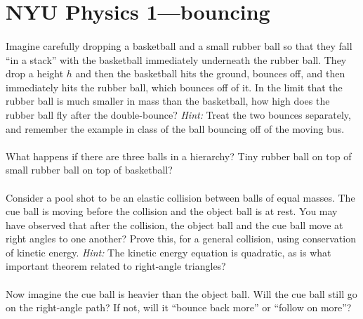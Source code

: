 \documentclass[12pt]{article}
\newcounter{problem}
\begin{document}
\sloppy\sloppypar\raggedbottom\frenchspacing\thispagestyle{empty}

\section*{NYU Physics 1---bouncing}

\paragraph{\theproblem}%
Imagine carefully dropping a basketball and a small rubber ball so
that they fall ``in a stack'' with the basketball immediately
underneath the rubber ball.  They drop a height $h$ and then the
basketball hits the ground, bounces off, and then immediately hits the
rubber ball, which bounces off of it.  In the limit that the rubber
ball is much smaller in mass than the basketball, how high does the
rubber ball fly after the double-bounce?  \emph{Hint:} Treat the two
bounces separately, and remember the example in class of the ball
bouncing off of the moving bus.

\paragraph{\theproblem}%
What happens if there are three balls in a hierarchy?  Tiny rubber
ball on top of small rubber ball on top of basketball?

\paragraph{\theproblem}%
Consider a pool shot to be an elastic collision between balls of equal
masses.  The cue ball is moving before the collision and the object
ball is at rest.  You may have observed that after the collision, the
object ball and the cue ball move at right angles to one another?
Prove this, for a general collision, using conservation of kinetic
energy.  \emph{Hint:} The kinetic energy equation is quadratic, as is
what important theorem related to right-angle triangles?

\paragraph{\theproblem}%
Now imagine the cue ball is heavier than the object ball.  Will the
cue ball still go on the right-angle path?  If not, will it ``bounce
back more'' or ``follow on more''?
\end{document}

